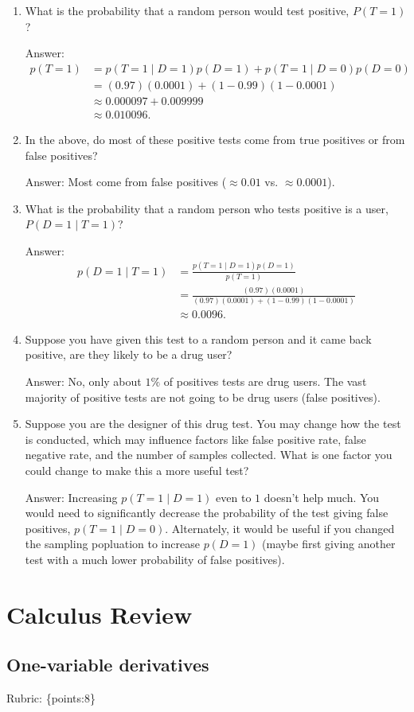 \documentclass{article}
\def\ans#1{\par\gre{Answer: #1}}
\def\rubric#1{\gre{Rubric: \{#1\}}}{}
\def\gre#1{{\color{gre}#1}}
\newcommand{\alignStar}[1]{\begin{align*}#1\end{align*}}
\begin{document}
	\begin{enumerate}
		\item What is the probability that a random person would test positive, $P(T=1)$?
		\ans{\alignStar{
				p(T = 1) & = p(T = 1 \mid D = 1)p(D = 1) + p(T = 1 \mid D = 0)p(D = 0)\\
				& = (0.97)(0.0001) + (1-0.99)(1-0.0001)\\
				& \approx 0.000097 + 0.009999\\
				& \approx 0.010096.
		}}
		\item In the above, do most of these positive tests come from true positives or from false positives?
		\ans{Most come from false positives ($\approx 0.01$ vs. $\approx 0.0001$).}
		\item What is the probability that a random person who tests positive is a user, $P(D=1 \mid T=1)$?
		\ans{\alignStar{
				p(D = 1 \mid T = 1) & = \frac{p(T = 1 \mid D=1)p(D=1)}{p(T = 1)}\\
				& = \frac{(0.97)(0.0001)}{(0.97)(0.0001) + (1-0.99)(1-0.0001)}\\
				& \approx 0.0096.
		}}
		\item Suppose you have given this test to a random person and it came back positive, are they likely to be a drug user?
		\ans{No, only about $1\%$ of positives tests are drug users. The vast majority of positive tests are not going to be drug users (false positives).}
		\item Suppose you are the designer of this drug test. You may change how the test is conducted, which may influence factors like false positive rate, false negative rate, and the number of samples collected. What is one factor you could change to make this a more useful test?
		\ans{Increasing $p(T=1 \mid D=1)$ even to $1$ doesn't help much. You would need to significantly decrease the probability of the test giving false positives, $p(T = 1 \mid D = 0)$. Alternately, it would be useful if you changed the sampling popluation to increase $p(D = 1)$ (maybe first giving another test with a much lower probability of false positives).}
	\end{enumerate}
	
	
	\section{Calculus Review}
	
	
	
	\subsection{One-variable derivatives}
	\label{sub.one.var}
	\rubric{points:8}
	
\end{document}
